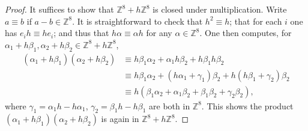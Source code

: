\documentclass[10pt,a4paper]{amsart}
\newcommand{\Z}{\mathbb{Z}}
\begin{document}
\begin{proof}
It suffices to show that $\mathbb{Z}^8 +h\mathbb{Z}^8$ is closed under multiplication. Write $a \equiv b$ if $a-b\in \Z^8$. It is straightforward to check that $h^2\equiv h$; that for each $i$ one has $e_i h \equiv h e_i$; and thus that $h\alpha \equiv \alpha h$ for any $\alpha \in \Z^8$. One then computes, for $\alpha_1+h\beta_1, \alpha_2+h\beta_2\in \Z^8 + h\Z^8$,
\begin{align*}
(\alpha_1+h\beta_1)(\alpha_2+h\beta_2)
& \equiv h\beta_1\alpha_2+\alpha_1h\beta_2+h\beta_1h\beta_2\\
&\equiv h\beta_1\alpha_2 + (h\alpha_1+\gamma_1)\beta_2+h(h\beta_1+\gamma_2)\beta_2 \\
&\equiv h (\beta_1\alpha_2+\alpha_1\beta_2+\beta_1\beta_2 +\gamma_2\beta_2),
\end{align*}
where $\gamma_1=\alpha_1h-h\alpha_1$, $\gamma_2=\beta_1 h-h\beta_1$ are both in $\Z^8$. This shows the product $(\alpha_1+h\beta_1)(\alpha_2+h\beta_2)$ is again in $\Z^8+h\Z^8$.
\end{proof}
\end{document}
